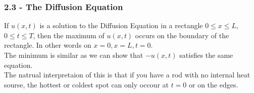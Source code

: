 \documentclass[answers,12pt,addpoints]{exam}
\begin{document}
\subsubsection{2.3 - The Diffusion Equation}
\begin{definition}
    If $u(x,t)$ is a solution to the Diffusion Equation in a rectangle $0 \leq x \leq L$, $0 \leq t \leq T$, then the maximum of $u(x,t)$ occurs on the boundary of the rectangle. In other words on $x = 0, x = L, t = 0$. \\
    The minimum is similar as we can show that $-u(x,t)$ satisfies the same equation.\\
    The natrual interpretaion of this is that if you have a rod with no internal heat sourse, the hottest or coldest spot can only occour at $t =0$ or on the edges. 
\end{definition}
\end{document}

